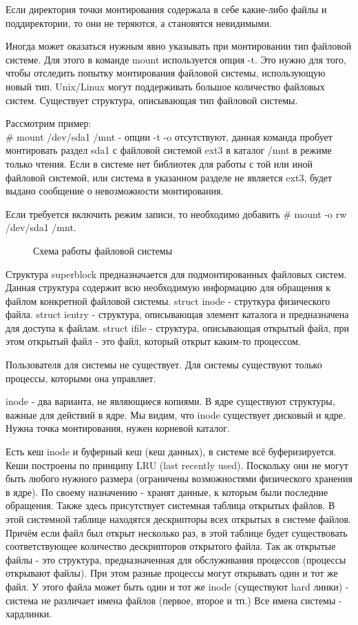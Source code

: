 Если директория точки монтирования содержала в себе какие-либо файлы и поддиректории, то они не теряются, а становятся невидимыми. 

Иногда может оказаться нужным явно указывать при монтировании тип файловой системе. Для этого в команде mount используется опция -t. Это нужно для того, чтобы отследить попытку монтирования файловой системы, использующую новый тип. Unix/Linux могут поддерживать большое количество файловых систем. Существует структура, описывающая тип файловой системы. 

Рассмотрим пример:\\
\# mount /dev/sda1 /mnt - опции -t -o отсутствуют, данная команда пробует монтировать раздел sda1 с файловой системой ext3 в каталог /mnt в режиме только чтения. Если в системе нет библиотек для работы с той или иной файловой системой, или система в указанном разделе не является ext3, будет выдано сообщение о невозможности монтирования. 

Если требуется включить режим записи, то необходимо добавить \# mount -o rw /dev/sda1 /mnt.

\begin{figure}[H]
	\center{\texttt{[image: 0]}}
	\caption{Схема работы файловой системы}
\end{figure}

Структура superblock предназначается для подмонтированных файловых систем. Данная структура содержит всю необходимую информацию для обращения к файлом конкретной файловой системы. struct inode - струткура физического файла. struct ientry - структура, описывающая элемент каталога и предназначена для доступа к файлам. struct ifile - структура, описывающая открытый файл, при этом открытый файл - это файл, который открыт каким-то процессом. 

Пользователя для системы не существует. Для системы существуют только процессы, которыми она управляет. 

inode - два варианта, не являющиеся копиями. В ядре существуют структуры, важные для действий в ядре. Мы видим, что inode существует дисковый и ядре. Нужна точка монтирования, нужен корневой каталог. 

Есть кеш inode и буферный кеш (кеш данных), в системе всё буферизируется. Кеши построены по принципу LRU (last recently used). Поскольку они не могут быть любого нужного размера (ограничены возможностями физического хранения в ядре). По своему назначению - хранят данные, к которым были последние обращения. Также здесь присутствует системная таблица открытых файлов. В этой системной таблице находятся дескрипторы всех открытых в системе файлов. Причём если файл был открыт несколько раз, в этой таблице будет существовать соответствующее количество дескрипторов открытого файла. Так ак открытые файлы - это структура, предназначенная для обслуживания процессов (процессы открывают файлы). При этом разные процессы могут открывать один и тот же файл. У этого файла может быть один и тот же inode (существуют hard линки) - система не различает имена файлов (первое, второе и тп.) Все имена системы - хардлинки.

